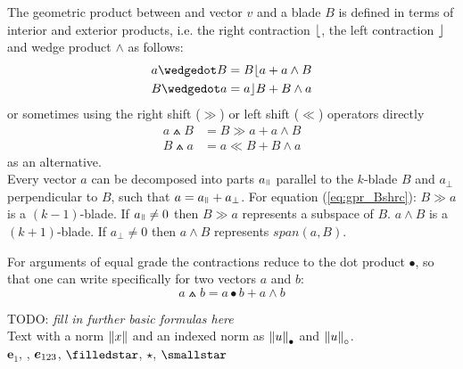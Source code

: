 The geometric product between and vector $v$ and a blade $B$ is defined in terms of
interior and exterior products, i.e. the right contraction $\lfloor$, the left contraction
$\rfloor$ and wedge product $\wedge$ as follows:
\begin{subequations}
    \begin{align}
    a \wedgedot B & =  B \rcontr a + a \wedge B
    \label{eq:gpr_Brc} \\
    B \wedgedot a & =  a \lcontr B + B \wedge a
    \label{eq:gpr_Blc}
    \end{align}
\end{subequations}
or sometimes using the right shift ($\gg$) or left shift ($\ll$) operators directly
\begin{subequations}
    \begin{align}
    a \wedgedot B & = B \gg a + a \wedge B
    \label{eq:gpr_Bshrc} \\
    B \wedgedot a & =  a \ll B + B \wedge a
    \label{eq:gpr_Bshlc}
    \end{align}
\end{subequations}
as an alternative. \\

Every vector $a$ can be decomposed into parts $a_{\parall}$ parallel to the $k$-blade $B$
and $a_{\perp}$ perpendicular to $B$, such that $a = a_{\parall} + a_{\perp}$. For
equation {(\ref{eq:gpr_Bshrc})}: $B \gg a$ is a $(k-1)$-blade. If $a_{\parall} \neq 0$
then $B \gg a$ represents a subspace of $B$. $a \wedge B$ is a $(k+1)$-blade. If
$a_{\perp} \neq 0$ then $a \wedge B$ represents $span(a,B)$.

For arguments of equal grade the contractions reduce to the dot
product $\bullet$, so that one can write specifically for two vectors $a$ and $b$:
\begin{equation}
    a \wedgedot b =  a \bullet b + a \wedge b
\end{equation}

TODO: \emph{fill in further basic formulas here} \\

Text with a norm $\left \lVert {x} \right \rVert$ and an indexed norm as ${\left \lVert {u} \right \rVert}_\bullet$ and
${\left \lVert {u} \right \rVert}_\circ$.\\

$\bm{e}_1$, , $\bm{e}_{123}$, $\filledstar$, $\star$, $\smallstar$
\\




\newpage